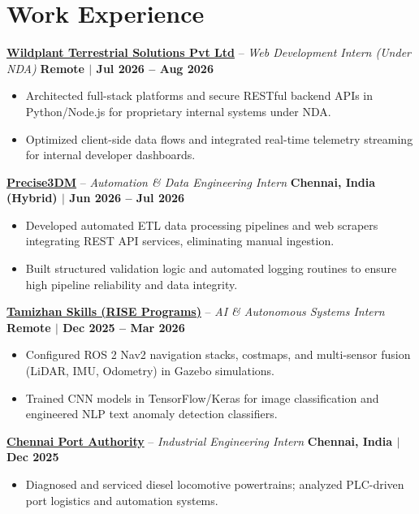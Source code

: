 \documentclass[letterpaper,10pt]{article}
\begin{document}
\section{Work Experience}
\noindent
\href{https://wildplant.in}{\textbf{Wildplant Terrestrial Solutions Pvt Ltd}} -- \textit{Web Development Intern (Under NDA)} \hfill \textbf{Remote $|$ Jul 2026 -- Aug 2026} \\
\begin{itemize}
    \item Architected full-stack platforms and secure RESTful backend APIs in Python/Node.js for proprietary internal systems under NDA.
    \item Optimized client-side data flows and integrated real-time telemetry streaming for internal developer dashboards.
\end{itemize}
\vspace{3pt}

\noindent
\href{https://precise3dm.com}{\textbf{Precise3DM}} -- \textit{Automation \& Data Engineering Intern} \hfill \textbf{Chennai, India (Hybrid) $|$ Jun 2026 -- Jul 2026} \\
\begin{itemize}
    \item Developed automated ETL data processing pipelines and web scrapers integrating REST API services, eliminating manual ingestion.
    \item Built structured validation logic and automated logging routines to ensure high pipeline reliability and data integrity.
\end{itemize}
\vspace{3pt}

\noindent
\href{https://tamizhanskill.com}{\textbf{Tamizhan Skills (RISE Programs)}} -- \textit{AI \& Autonomous Systems Intern} \hfill \textbf{Remote $|$ Dec 2025 -- Mar 2026} \\
\begin{itemize}
    \item Configured ROS 2 Nav2 navigation stacks, costmaps, and multi-sensor fusion (LiDAR, IMU, Odometry) in Gazebo simulations.
    \item Trained CNN models in TensorFlow/Keras for image classification and engineered NLP text anomaly detection classifiers.
\end{itemize}
\vspace{3pt}

\noindent
\href{https://chennaiport.gov.in}{\textbf{Chennai Port Authority}} -- \textit{Industrial Engineering Intern} \hfill \textbf{Chennai, India $|$ Dec 2025} \\
\begin{itemize}
    \item Diagnosed and serviced diesel locomotive powertrains; analyzed PLC-driven port logistics and automation systems.
\end{itemize}
\end{document}
